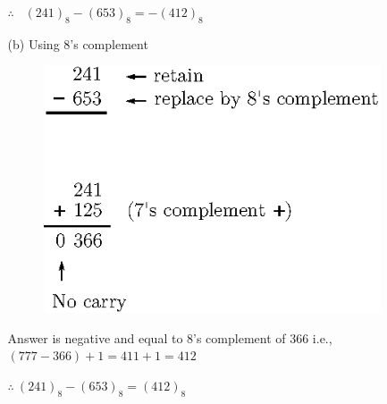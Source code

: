 \begin{solution}
\begin{itemize}
\begin{itemize}
$\therefore$~ $(241)_{8}-(653)_{8}=-(412)_{8}$

\item[(b)] Using $8$'s complement
\begin{figure}[H]
\centering
\includegraphics[scale=1.05]{chap6/fig66.eps}
\end{figure}
Answer is negative and equal to $8$'s complement of 366 i.e., $(777-366)+1=411+1=412$

$\therefore~ (241)_{8}-(653)_{8}=(412)_{8}$
\end{itemize}

\eject


\end{itemize}
\end{solution}
